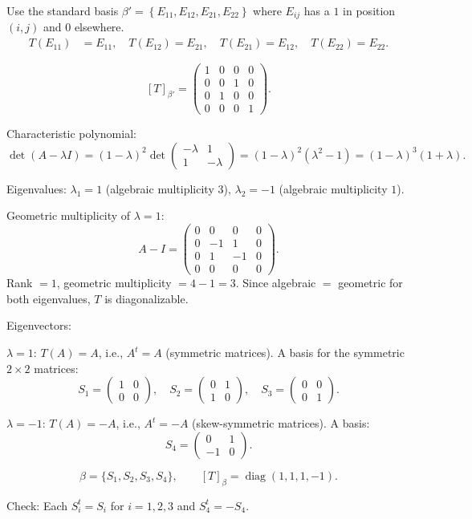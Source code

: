 \documentclass{article}
\begin{document}
\begin{mdframed}[linewidth=1pt]
Use the standard basis $\beta' = \left\{E_{11}, E_{12}, E_{21}, E_{22}\right\}$ where $E_{ij}$ has a $1$ in position $(i,j)$ and $0$ elsewhere.
\begin{align*}
T(E_{11}) &= E_{11}, \quad T(E_{12}) = E_{21}, \quad T(E_{21}) = E_{12}, \quad T(E_{22}) = E_{22}.
\end{align*}

\[
[T]_{\beta'} = \begin{pmatrix} 1 & 0 & 0 & 0 \\ 0 & 0 & 1 & 0 \\ 0 & 1 & 0 & 0 \\ 0 & 0 & 0 & 1 \end{pmatrix}.
\]

\textnormal{Characteristic polynomial:}
\[
\det(A-\lambda I) = (1-\lambda)^2 \det\begin{pmatrix}-\lambda & 1 \\ 1 & -\lambda\end{pmatrix} = (1-\lambda)^2(\lambda^2 - 1) = (1-\lambda)^3(1+\lambda).
\]

Eigenvalues: $\lambda_1 = 1$ (algebraic multiplicity $3$), $\lambda_2 = -1$ (algebraic multiplicity $1$).

\textnormal{Geometric multiplicity of $\lambda = 1$:}
\[
A - I = \begin{pmatrix} 0&0&0&0 \\ 0&-1&1&0 \\ 0&1&-1&0 \\ 0&0&0&0 \end{pmatrix}.
\]
Rank $= 1$, geometric multiplicity $= 4 - 1 = 3$.
Since algebraic $=$ geometric for both eigenvalues, $T$ is \textnormal{diagonalizable}.

\textnormal{Eigenvectors:}

$\lambda = 1$: $T(A) = A$, i.e., $A^t = A$ (symmetric matrices). A basis for the symmetric $2 \times 2$ matrices:
\[
S_1 = \begin{pmatrix}1&0\\0&0\end{pmatrix}, \quad S_2 = \begin{pmatrix}0&1\\1&0\end{pmatrix}, \quad S_3 = \begin{pmatrix}0&0\\0&1\end{pmatrix}.
\]

$\lambda = -1$: $T(A) = -A$, i.e., $A^t = -A$ (skew-symmetric matrices). A basis:
\[
S_4 = \begin{pmatrix}0&1\\-1&0\end{pmatrix}.
\]

\[
\boxed{\beta = \{S_1, S_2, S_3, S_4\}, \qquad [T]_\beta = \operatorname{diag}(1, 1, 1, -1).}
\]

\textnormal{Check:} Each $S_i^t = S_i$ for $i=1,2,3$ and $S_4^t = -S_4$.\end{mdframed}
\end{document}

